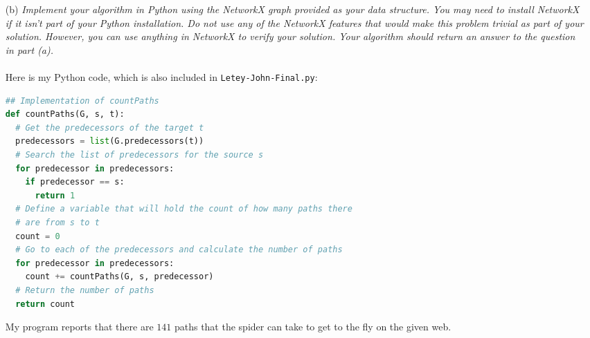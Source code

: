 \documentclass[12pt]{article}
\begin{document}
{\begin{enumerate}
\item[(b)]\textsl{Implement your algorithm in Python using the NetworkX graph provided as your data structure. You may need to install NetworkX if it isn’t part of your Python installation. Do not use any of the NetworkX features that would make this problem trivial as part of your solution. However, you can use anything in NetworkX to verify your solution. Your algorithm should return an answer to the question in part (a).}\\ \\
Here is my Python code, which is also included in \texttt{Letey-John-Final.py}:
\begin{lstlisting}[language=Python]
## Implementation of countPaths
def countPaths(G, s, t):
  # Get the predecessors of the target t
  predecessors = list(G.predecessors(t))
  # Search the list of predecessors for the source s
  for predecessor in predecessors:
    if predecessor == s:
      return 1
  # Define a variable that will hold the count of how many paths there
  # are from s to t
  count = 0
  # Go to each of the predecessors and calculate the number of paths
  for predecessor in predecessors:
    count += countPaths(G, s, predecessor)
  # Return the number of paths
  return count
\end{lstlisting}
My program reports that there are $\boxed{141}$ paths that the spider can take to get to the fly on the given web.
\end{enumerate}

}
\end{document}
